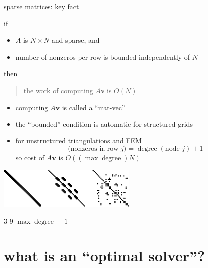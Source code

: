 \documentclass[hide notes,intlimits,usenames,dvipsnames]{beamer}
\newcommand{\bv}{\mathbf{v}}
\begin{document}
\begin{frame}{sparse matrices: key fact}

if
\begin{itemize}
\item $A$ is $N\times N$ and sparse, and
\item number of nonzeros per row is bounded independently of $N$
\end{itemize}
then
\begin{quote}
the work of computing $A \bv$ is $O(N)$
\end{quote}

\begin{itemize}
\item computing $A \bv$ is called a ``mat-vec''
\item the ``bounded'' condition is automatic for structured grids
\item for unstructured triangulations and FEM
   $$\text{(nonzeros in row } j) = \operatorname{degree}(\text{node } j) + 1$$
so cost of $A\bv$ is $O((\max \operatorname{degree}) N)$
\end{itemize}

\bigskip
\begin{center}
\includegraphics[width=0.5\textwidth]{figs/spythree}

\tiny

\qquad $3$ \qquad\qquad\qquad\qquad $9$ \qquad\qquad\quad $\max \operatorname{degree} + 1$
\end{center}
\end{frame}


\section{what is an ``optimal solver''?}
\end{document}
